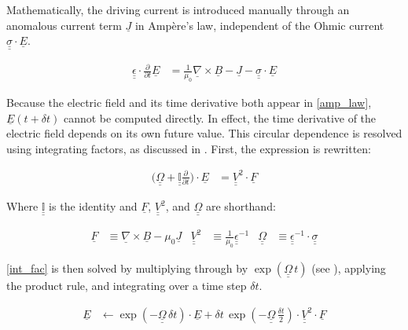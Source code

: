 \documentclass[draft,linenumbers]{agujournal}
\begin{document}
Mathematically, the driving current is introduced manually through an anomalous current term $\underline{J}$ in Amp\`ere's law, independent of the Ohmic current ${\underline{\underline{\sigma}} \cdot \underline{E}}$.

\begin{linenomath*}
\begin{align}
    \label{amp_law}
    \underline{\underline{\epsilon}} \cdot \frac{\partial}{\partial t} \underline{E} &= \frac{1}{\mu_0} \underline{\nabla} \times \underline{B} - \underline{J}
      - \underline{\underline{\sigma}} \cdot \underline{E}
\end{align}
\end{linenomath*}


Because the electric field and its time derivative both appear in \cref{amp_law}, $\underline{E}(t + \delta \! t)$ cannot be computed directly. In effect, the time derivative of the electric field depends on its own future value. This circular dependence is resolved using integrating factors, as discussed in \citet{lysak_2013}. First, the expression is rewritten:
\begin{linenomath*}
\begin{align}
    \label{int_fac}
    \Big( \underline{\underline{\Omega}} + \underline{\underline{ \mathbb{I} }}\frac{\partial}{\partial t} \Big) \cdot
        \underline{E} &= \underline{\underline{V}}^2 \cdot \underline{F}
\end{align}
\end{linenomath*}

Where $\underline{\underline{ \mathbb{I} }}$ is the identity and $\underline{F}$, $\underline{\underline{V}}^2$, and $\underline{\underline{\Omega}}$ are shorthand:
\begin{linenomath*}
\begin{align}
    \underline{F} &\equiv \underline{\nabla} \times \underline{B} - \mu_0 \underline{J} &
    \underline{\underline{V}}^2 &\equiv \frac{1}{\mu_0} \underline{\underline{\epsilon}}^{-1} &
    \underline{\underline{\Omega}} &\equiv \underline{\underline{\epsilon}}^{-1} \cdot \underline{\underline{\sigma}}
\end{align}
\end{linenomath*}

\cref{int_fac} is then solved by multiplying through by $\exp \left( \underline{\underline{\Omega}} \, t \right)$ (see \citet{hall_2015}), applying the product rule, and integrating over a time step $\delta \! t$.
\begin{linenomath*}
\begin{align}
    \label{amp_final}
    \underline{E} &\leftarrow \exp \left( -\underline{\underline{\Omega}} \, \delta \! t \right) \cdot \underline{E} +
        \delta \! t \, \exp \left( -\underline{\underline{\Omega}} \, \tfrac{\delta \! t}{2} \right) \cdot
        \underline{\underline{V}}^2 \cdot \underline{F}
\end{align}
\end{linenomath*}
\end{document}
